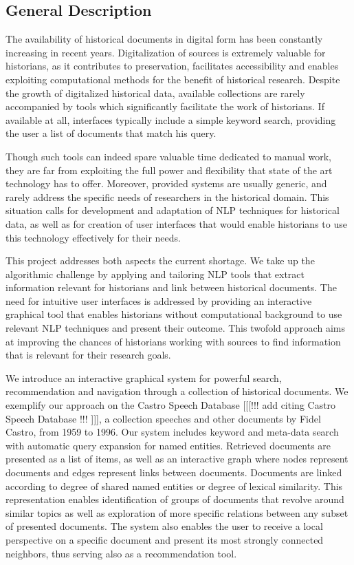 

\subsection{General Description}
\label{sec:general_description}
The availability of historical documents in digital form has been constantly increasing in recent years. Digitalization of sources is extremely valuable for historians, as it contributes to preservation, facilitates accessibility and enables exploiting computational methods for the benefit of historical research. Despite the growth of digitalized historical data, available collections are rarely accompanied by tools which significantly facilitate the work of historians. If available at all,  interfaces typically include a simple keyword search, providing the user a list of documents that match his query. 

Though such tools can indeed spare valuable time dedicated to manual work, they are far from exploiting the full power and flexibility that state of the art technology has to offer. Moreover, provided systems are usually generic, and rarely address the specific needs of researchers in the historical domain. This situation calls for development and adaptation of NLP techniques for historical data, as well as for creation of user interfaces that would enable historians to use this technology effectively for their needs. 

This project addresses both aspects the current shortage. We take up the algorithmic challenge by applying and tailoring NLP tools that extract information relevant for historians and link between historical documents. The need for intuitive user interfaces is addressed by providing an interactive graphical tool that enables historians without computational background to use relevant NLP techniques and present their outcome. This twofold approach aims at improving the chances of historians working with sources to find information that is relevant for their research goals.

We introduce an interactive graphical system for powerful search, recommendation and navigation through a collection of historical documents. We exemplify our approach on the Castro Speech Database [[[!!! add citing Castro Speech Database !!! ]]], a collection speeches and other documents by Fidel Castro, from 1959 to 1996. Our system includes keyword and meta-data search with automatic query expansion for named entities. Retrieved documents are presented as a list of items, as well as an interactive graph where nodes represent documents and edges represent links between documents. Documents are linked according to degree of shared named entities or degree of lexical similarity. This representation enables identification of groups of documents that revolve around similar topics as well as exploration of more specific relations between any subset of presented documents. The system also enables the user to receive a local perspective on a specific document and present its most strongly connected neighbors, thus serving also as a recommendation tool. 

